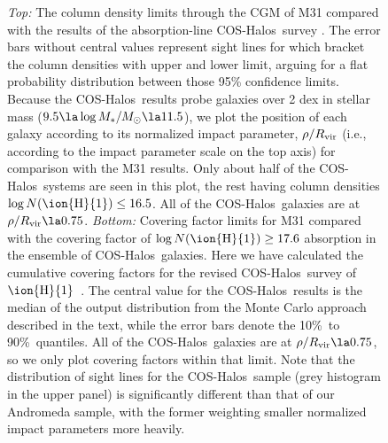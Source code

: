 \documentclass[12pt,preprint]{aastex6}
\newcommand{\HI}{\ensuremath{\mbox{\ion{H}{1}}}}
\newcommand{\NHI}{\ensuremath{N(\mbox{\ion{H}{1}})}\relax}
\newcommand{\Rvir}{\ensuremath{R_{\rm vir}}\relax}
\newcommand{\coshalos}{COS-Halos}
\begin{document}
\begin{figure}
  \caption{{\em Top:} The column density limits through the CGM of M31
    compared with the results of the absorption-line \coshalos\ survey
    \cite[see also \citealt{thom2012,
      tumlinson2013}]{prochaska2017}. The error bars without central
    values represent sight lines for which \cite{prochaska2017}
    bracket the column densities with upper and lower limit, arguing
    for a flat probability distribution between those 95\% confidence
    limits. Because the \coshalos\ results probe galaxies over 2 dex
    in stellar mass ($9.5 \la \log M_*/M_\odot \la 11.5$), we plot the
    position of each galaxy according to its normalized impact
    parameter, $\rho / \Rvir$ (i.e., according to the impact parameter
    scale on the top axis) for comparison with the M31 results. Only
    about half of the \coshalos\ systems are seen in this plot, the
    rest having column densities $\log \NHI \le 16.5$. All of the
    \coshalos\ galaxies are at $\rho / \Rvir \la 0.75$. {\em Bottom:}
    Covering factor limits for M31 compared with the covering factor
    of $\log \NHI \ge 17.6$ absorption in the ensemble of \coshalos\
    galaxies. Here we have calculated the cumulative covering factors
    for the revised \coshalos\ survey of \HI\ \citep[][see also
    \citealt{thom2012,tumlinson2013}]{prochaska2017}. The central
    value for the \coshalos\ results is the median of the output
    distribution from the Monte Carlo approach described in the text,
    while the error bars denote the 10\%\ to 90\%\ quantiles.  All of
    the \coshalos\ galaxies are at $\rho / \Rvir \la 0.75$, so we only
    plot covering factors within that limit. Note that the
    distribution of sight lines for the \coshalos\ sample (grey
    histogram in the upper panel) is significantly different than that
    of our Andromeda sample, with the former weighting smaller
    normalized impact parameters more
    heavily.\label{fig:CHcomparison}}
\end{figure}
\end{document}
